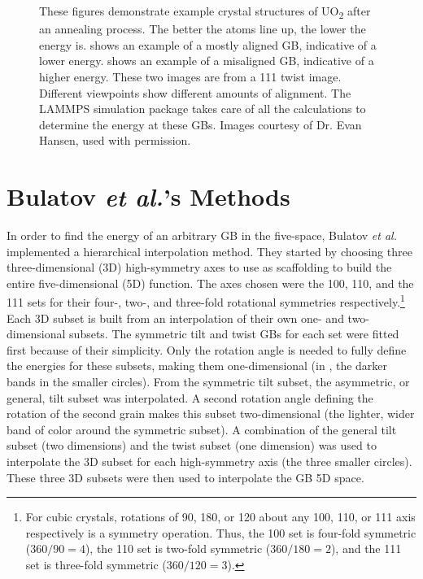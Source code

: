 \documentclass[12pt]{report}
\begin{document}
\begin{figure}[ht!]
 \caption{\label{fig:lammps}These figures demonstrate example crystal structures of UO\textsubscript{2} after an annealing process.  The better the atoms line up, the lower the energy is. \protect{} shows an example of a mostly aligned GB, indicative of a lower energy.  \protect{} shows an example of a misaligned GB, indicative of a higher energy.  These two images are from a \textlangle{}111\textrangle{} twist image.  Different viewpoints show different amounts of alignment.  The LAMMPS simulation package takes care of all the calculations to determine the energy at these GBs. Images courtesy of Dr. Evan Hansen, used with permission.}
\end{figure}

\section{Bulatov \emph{et al.}'s Methods}
In order to find the energy of an arbitrary GB in the five-space, Bulatov \emph{et al.}\cite{bulatov2014} implemented a hierarchical interpolation method.  They started by choosing three three-dimensional (3D) high-symmetry axes to use as scaffolding to build the entire five-dimensional (5D) function.  The axes chosen were the \textlangle{}100\textrangle{}, \textlangle{}110\textrangle{}, and the \textlangle{}111\textrangle{} sets for their four-, two-, and three-fold rotational symmetries respectively.\footnote{For cubic crystals, rotations of 90\textdegree{}, 180\textdegree{}, or 120\textdegree{} about any \textlangle{}100\textrangle{}, \textlangle{}110\textrangle{}, or \textlangle{}111\textrangle{} axis respectively is a symmetry operation.\cite{stokes2007}  Thus, the \textlangle{}100\textrangle{} set is four-fold symmetric (360\textdegree{}$/90$\textdegree{}$=4$), the \textlangle{}110\textrangle{} set is two-fold symmetric (360\textdegree{}$/180$\textdegree{}$=2$), and the \textlangle{}111\textrangle{} set is three-fold symmetric (360\textdegree{}$/120$\textdegree{}$=3$).}  Each 3D subset is built from an interpolation of their own one- and two-dimensional subsets.  The symmetric tilt and twist GBs for each set were fitted first because of their simplicity.  Only the rotation angle is needed to fully define the energies for these subsets, making them one-dimensional (in , the darker bands in the smaller circles).  From the symmetric tilt subset, the asymmetric, or general, tilt subset was interpolated.  A second rotation angle defining the rotation of the second grain makes this subset two-dimensional (the lighter, wider band of color around the symmetric subset).  A combination of the general tilt subset (two dimensions) and the twist subset (one dimension) was used to interpolate the 3D subset for each high-symmetry axis (the three smaller circles).  These three 3D subsets were then used to interpolate the GB 5D space.
\end{document}

